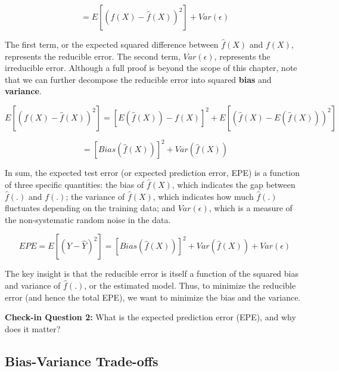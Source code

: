 \documentclass{book}
\newenvironment{shaded*}{
    \begin{center}
    \begin{tabular}{|p{0.9\textwidth}|}
    \hline\\
    }
    { 
    \\\\\hline
    \end{tabular} 
    \end{center}
}
\begin{document}
\[=E \left[  \left( f \left( X \right) -\hat{f} \left( X \right)  \right) ^{2} \right] +Var \left(  \epsilon  \right)\]

The first term, or the expected squared difference between \(\hat{f}(X)\) and
\({f}(X)\), represents the reducible error. The second term,
\(Var(\epsilon)\), represents the irreducible error. Although a full proof is
beyond the scope of this chapter, note that we can further decompose the
reducible error into squared \textbf{bias} and \textbf{variance}.

\[E \left[  \left( f \left( X \right) -\hat{f} \left( X \right)  \right) ^{2} \right] = \left[ E \left( \hat{f} \left( X \right)  \right) -f \left( X \right)  \right] ^{2}+E \left[  \left( \hat{f} \left( X \right) -E \left( \hat{f} \left( X \right)  \right)  \right) ^{2} \right]\]

\[= \left[ Bias \left( \hat{f} \left( X \right)  \right)  \right] ^{2}+Var \left( \hat{f} \left( X \right)  \right)\]

In sum, the expected test error (or expected prediction error, EPE) is a
function of three specific quantities: the bias of \(\hat{f}(X)\), which
indicates the gap between \(\hat{f}(.)\) and \(f(.)\); the variance of
\(\hat{f}(X)\), which indicates how much \(\hat{f}(.)\) fluctuates depending
on the training data; and \(Var(\epsilon)\), which is a measure of the
non-systematic random noise in the data.

\[EPE=E \left[  \left( Y-\hat{Y} \right) ^{2} \right] = \left[ Bias \left( \hat{f} \left( X \right)  \right)  \right] ^{2}+Var \left( \hat{f} \left( X \right)  \right) +Var \left(  \epsilon  \right)\]

The key insight is that the reducible error is itself a function of the
squared bias and variance of \(\hat{f}(.)\), or the estimated model. Thus, to
minimize the reducible error (and hence the total EPE), we want to minimize
the bias and the variance.

\begin{shaded*}

\textbf{Check-in Question 2:} What is the expected prediction error (EPE), and
why does it matter?

\end{shaded*}

\hypertarget{bias-variance-trade-offs}{%
\subsection{Bias-Variance Trade-offs}\label{bias-variance-trade-offs}}
\end{document}
